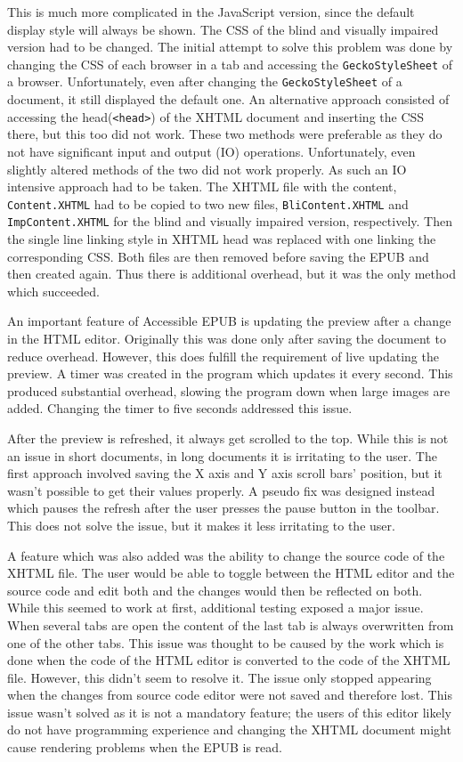 This is much more complicated in the JavaScript version, since the default display style will always be shown. The CSS of the blind and visually impaired version had to be changed. The initial attempt to solve this problem was done by changing the CSS of each browser in a tab and accessing the \lstinline|GeckoStyleSheet| of a browser. Unfortunately, even after changing the \lstinline|GeckoStyleSheet| of a document, it still displayed the default one. An alternative approach consisted of accessing the head(\lstinline|<head>|) of the XHTML document and inserting the CSS there, but this too did not work. These two methods were preferable as they do not have significant input and output (IO) operations. Unfortunately, even slightly altered methods of the two did not work properly. As such an IO intensive approach had to be taken. The XHTML file with the content, \lstinline|Content.XHTML| had to be copied to two new files, \lstinline|BliContent.XHTML| and \lstinline|ImpContent.XHTML| for the blind and visually impaired version, respectively. Then the single line linking style in XHTML head was replaced with one linking the corresponding CSS. 
Both files are then removed before saving the EPUB and then created again. Thus there is additional overhead, but it was the only method which succeeded.

An important feature of Accessible EPUB is updating the preview after a change in the HTML editor. Originally this was done only after saving the document to reduce overhead. However, this does fulfill the requirement of live updating the preview. A timer was created in the program which updates it every second. This produced substantial overhead, slowing the program down when large images are added. Changing the timer to five seconds addressed this issue. 

After the preview is refreshed, it always get scrolled to the top. While this is not an issue in short documents, in long documents it is irritating to the user. The first approach involved saving the X axis and Y axis scroll bars' position, but it wasn't possible to get their values properly. A pseudo fix was designed instead which pauses the refresh after the user presses the pause button in the toolbar. This does not solve the issue, but it makes it less irritating to the user.

A feature which was also added was the ability to change the source code of the XHTML file. The user would be able to toggle between the HTML editor and the source code and edit both and the changes would then be reflected on both. While this seemed to work at first, additional testing exposed a major issue. When several tabs are open the content of the last tab is always overwritten from one of the other tabs. This issue was thought to be caused by the work which is done when the code of the HTML editor is converted to the code of the XHTML file. However, this didn't seem to resolve it. The issue only stopped appearing when the changes from source code editor were not saved and therefore lost. This issue wasn't solved as it is not a mandatory feature; the users of this editor likely do not have programming experience and changing the XHTML document might cause rendering problems when the EPUB is read. 

